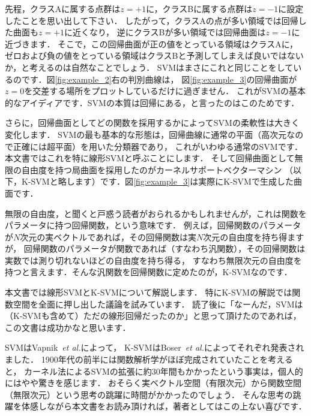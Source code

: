 先程，クラスAに属する点群は$z = +1$に，クラスBに属する点群は$z = -1$に設定したことを思い出して下さい．
したがって，クラスAの点が多い領域では回帰した曲面も$z = +1$に近くなり，
逆にクラスBが多い領域では回帰曲面は$z = -1$に近づきます．
そこで，この回帰曲面が正の値をとっている領域はクラスAに，
ゼロおよび負の値をとっている領域はクラスBと予測してしまえば良いではないか，と考えるのは自然なことでしょう．
SVMはまさにこれと同じことをしているのです．図\ref{fig:example_2}右の判別曲線は，
図\ref{fig:example_3}の回帰曲面が$z = 0$を交差する場所をプロットしているだけに過ぎません．
これがSVMの基本的なアイディアです．SVMの本質は回帰にある，と言ったのはこのためです．

さらに，回帰曲面としてどの関数を採用するかによってSVMの柔軟性は大きく変化します．
SVMの最も基本的な形態は，回帰曲線に通常の平面（高次元なので正確には超平面）を用いた分類器であり，
これがいわゆる通常のSVMです．本文書ではこれを特に線形SVMと呼ぶことにします．
そして回帰曲面として無限の自由度を持つ局曲面を採用したのがカーネルサポートベクターマシン
（以下，K-SVMと略します）です．図\ref{fig:example_3}は実際にK-SVMで生成した曲面です．

無限の自由度，と聞くと戸惑う読者がおられるかもしれませんが，これは関数をパラメータに持つ回帰関数，という意味です．
例えば，回帰関数のパラメータが$N$次元の実ベクトルであれば，その回帰関数は実$N$次元の自由度を持ち得ますが，
回帰関数のパラメータが関数であれば（すなわち汎関数），その回帰関数は実数では測り切れないほどの自由度を持ち得る，
すなわち無限次元の自由度を持つと言えます．そんな汎関数を回帰関数に定めたのが，K-SVMなのです．

本文書では線形SVMとK-SVMについて解説します．
特にK-SVMの解説では関数空間を全面に押し出した議論を試みています．
読了後に「なーんだ，SVMは（K-SVMも含めて）ただの線形回帰だったのか」と思って頂けたのであれば，
この文書は成功かなと思います．

SVMはVapnik~\textit{et al.}\cite{Vapnik1963}によって，
K-SVMはBoser~\textit{et al.}\cite{Boser1992}によってそれぞれ発表されました．
1900年代の前半には関数解析学がほぼ完成されていたことを考えると，
カーネル法によるSVMの拡張に約30年間もかかったという事実は，個人的にはやや驚きを感じます．
おそらく実ベクトル空間（有限次元）から関数空間（無限次元）という思考の跳躍に時間がかかったのでしょう．
そんな思考の跳躍を体感しながら本文書をお読み頂ければ，著者としてはこの上ない喜びです．

